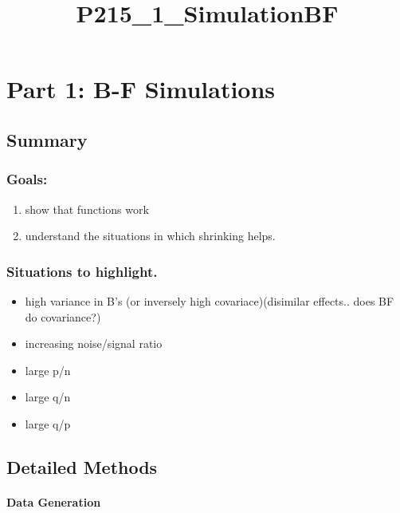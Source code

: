 \documentclass{article}
\title{P215\_1\_SimulationBF}
\begin{document}
    
    
    \maketitle
    
    

    
    \section{Part 1: B-F Simulations}\label{part-1-b-f-simulations}

\subsection{Summary}\label{summary}

\subsubsection{Goals:}\label{goals}

\begin{enumerate}
\def\labelenumi{\arabic{enumi}.}
\itemsep1pt\parskip0pt
\item
  show that functions work
\item
  understand the situations in which shrinking helps.
\end{enumerate}

\subsubsection{Situations to highlight.}\label{situations-to-highlight.}

\begin{itemize}
\itemsep1pt\parskip0pt
\item
  high variance in B's (or inversely high covariace)(disimilar effects..
  does BF do covariance?)
\item
  increasing noise/signal ratio
\item
  large p/n
\item
  large q/n
\item
  large q/p
\end{itemize}

    \subsection{Detailed Methods}\label{detailed-methods}

\paragraph{Data Generation}\label{data-generation}
\end{document}
